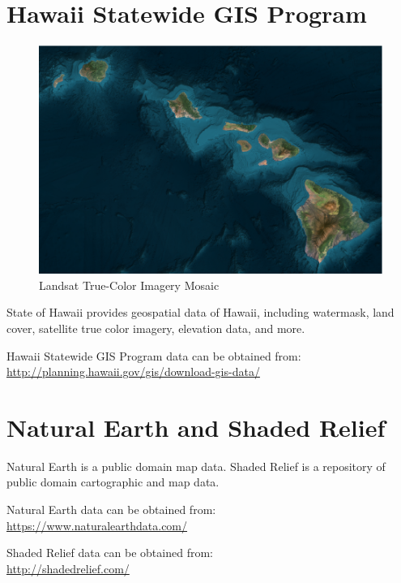\section{Hawaii Statewide GIS Program}

\begin{figure}[h!]
  \centering
  \includegraphics[width=120mm]{images/hawaii_gis_landsat_7.eps}
  \caption{Landsat True-Color Imagery Mosaic}
\end{figure}

State of Hawaii provides geospatial data of Hawaii, including watermask, land cover, satellite true color imagery, elevation data, and more.

Hawaii Statewide GIS Program data can be obtained from: \cite{Terrain-StateOfHawaiiGIS} \\
\url{http://planning.hawaii.gov/gis/download-gis-data/}

\section{Natural Earth and Shaded Relief}

Natural Earth is a public domain map data. Shaded Relief is a repository of public domain cartographic and map data.

Natural Earth data can be obtained from: \cite{Terrain-NaturalEarth}  \\
\url{https://www.naturalearthdata.com/}

Shaded Relief data can be obtained from: \cite{Terrain-ShadedRelief} \\
\url{http://shadedrelief.com/}
